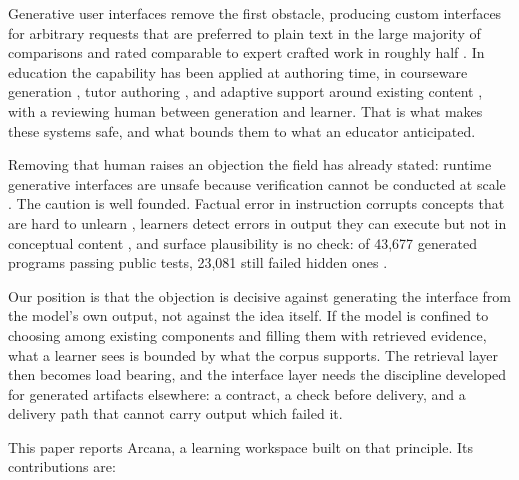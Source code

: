 \documentclass[conference]{IEEEtran}
\newcommand{\sys}{Arcana}
\begin{document}
Generative user interfaces remove the first obstacle, producing custom interfaces for arbitrary requests that are preferred to plain text in the large majority of comparisons and rated comparable to expert crafted work in roughly half \cite{ref:leviathan}. In education the capability has been applied at authoring time, in courseware generation \cite{ref:maicui}, tutor authoring \cite{ref:calo}, and adaptive support around existing content \cite{ref:learnmate}, with a reviewing human between generation and learner. That is what makes these systems safe, and what bounds them to what an educator anticipated.

Removing that human raises an objection the field has already stated: runtime generative interfaces are unsafe because verification cannot be conducted at scale \cite{ref:neshaei}. The caution is well founded. Factual error in instruction corrupts concepts that are hard to unlearn \cite{ref:eduevaldb}, learners detect errors in output they can execute but not in conceptual content \cite{ref:shoufan}, and surface plausibility is no check: of 43,677 generated programs passing public tests, 23,081 still failed hidden ones \cite{ref:codemonitor}.

Our position is that the objection is decisive against generating the interface from the model's own output, not against the idea itself. If the model is confined to choosing among existing components and filling them with retrieved evidence, what a learner sees is bounded by what the corpus supports. The retrieval layer then becomes load bearing, and the interface layer needs the discipline developed for generated artifacts elsewhere: a contract, a check before delivery, and a delivery path that cannot carry output which failed it.

This paper reports \sys{}, a learning workspace built on that principle. Its contributions are:
\end{document}
